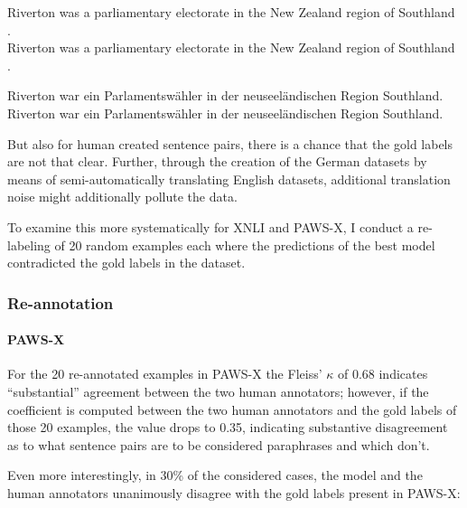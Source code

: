 \begin{examples}
  \item Riverton was a parliamentary electorate in the New Zealand region of Southland .\\
        Riverton was a parliamentary electorate in the New Zealand region of Southland .

  \item Riverton war ein Parlamentswähler in der neuseeländischen Region Southland.\\
        Riverton war ein Parlamentswähler in der neuseeländischen Region Southland.
\end{examples}

But also for human created sentence pairs, there
is a chance that the gold labels are not that clear. Further, through the creation of the German
datasets by means of semi-automatically translating English datasets, additional translation
noise might additionally pollute the data.

To examine this more systematically for XNLI and PAWS-X, I conduct a re-labeling of 20 random
examples each  where the predictions of the best model contradicted the gold labels in the dataset.


\subsubsection{Re-annotation}

\paragraph*{PAWS-X}

For the 20 re-annotated examples in PAWS-X the Fleiss' $\kappa$ of 0.68 indicates ``substantial'' agreement
between the two human annotators; however, if the coefficient is computed between the two human annotators
and the gold labels of those 20 examples, the value drops to 0.35, indicating substantive disagreement
as to what sentence pairs are to be considered paraphrases and which don't.

Even more interestingly, in 30\% of the considered cases, the model and the human annotators unanimously
disagree with the gold labels present in PAWS-X:



